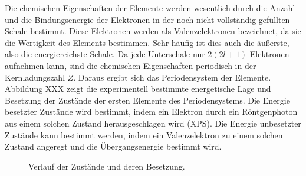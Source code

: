 Die chemischen Eigenschaften der Elemente werden wesentlich durch die Anzahl und die Bindungsenergie der Elektronen in der noch nicht vollständig gefüllten Schale bestimmt. Diese Elektronen werden als Valenzelektronen bezeichnet, da sie die Wertigkeit des Elements bestimmen. Sehr häufig ist dies auch die äußerste, also die energiereichste Schale. Da jede Unterschale nur $2 (2l +1)$ Elektronen aufnehmen kann, sind die chemischen Eigenschaften periodisch in der Kernladungszahl $Z$. Daraus ergibt sich das Periodensystem der Elemente. Abbildung XXX zeigt die experimentell bestimmte energetische Lage und Besetzung der Zustände der ersten Elemente des Periodensystems. Die Energie besetzter Zustände wird bestimmt, indem ein Elektron durch ein Röntgenphoton aus einem solchen Zustand herausgeschlagen wird (XPS). Die Energie unbesetzter Zustände kann bestimmt werden, indem ein Valenzelektron zu einem solchen Zustand angeregt und die Übergangsenergie bestimmt wird.

\begin{figure}
    \caption{Verlauf der Zustände und deren Besetzung.}
\end{figure}

